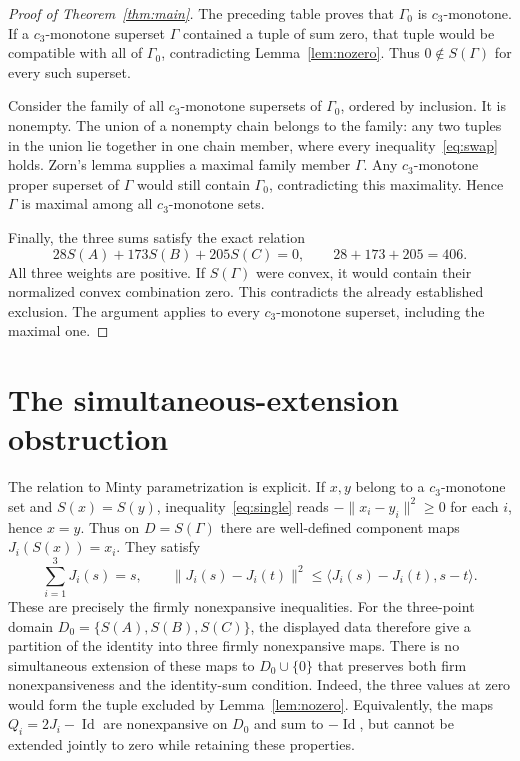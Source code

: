 \documentclass[11pt]{article}
\newcommand{\ip}[2]{\langle #1,#2\rangle}
\newcommand{\norm}[1]{\lVert #1\rVert}
\begin{document}
\begin{proof}[Proof of Theorem~\ref{thm:main}]
The preceding table proves that $\Gamma_0$ is $c_3$-monotone. If a
$c_3$-monotone superset $\Gamma$ contained a tuple of sum zero, that tuple
would be compatible with all of $\Gamma_0$, contradicting
Lemma~\ref{lem:nozero}. Thus $0\notin S(\Gamma)$ for every such superset.

Consider the family of all $c_3$-monotone supersets of $\Gamma_0$, ordered
by inclusion. It is nonempty. The union of a nonempty chain belongs to
the family: any two tuples in the union lie together in one chain member,
where every inequality~\eqref{eq:swap} holds. Zorn's lemma supplies a
maximal family member $\Gamma$. Any $c_3$-monotone proper superset of
$\Gamma$ would still contain $\Gamma_0$, contradicting this maximality.
Hence $\Gamma$ is maximal among all $c_3$-monotone sets.

Finally, the three sums satisfy the exact relation
\[
 28S(A)+173S(B)+205S(C)=0,
 \qquad 28+173+205=406.
\]
All three weights are positive. If $S(\Gamma)$ were convex, it would
contain their normalized convex combination zero. This contradicts the
already established exclusion. The argument applies to every
$c_3$-monotone superset, including the maximal one.
\end{proof}

\section{The simultaneous-extension obstruction}

The relation to Minty parametrization is explicit. If $x,y$ belong to a
$c_3$-monotone set and $S(x)=S(y)$, inequality~\eqref{eq:single} reads
$-\norm{x_i-y_i}^2\ge0$ for each $i$, hence $x=y$. Thus on
$D=S(\Gamma)$ there are well-defined component maps
$J_i(S(x))=x_i$. They satisfy
\[
 \sum_{i=1}^3J_i(s)=s,\qquad
 \norm{J_i(s)-J_i(t)}^2\le
 \ip{J_i(s)-J_i(t)}{s-t}.
\]
These are precisely the firmly nonexpansive inequalities. For the
three-point domain $D_0=\{S(A),S(B),S(C)\}$, the displayed data therefore
give a partition of the identity into three firmly nonexpansive maps.
There is no simultaneous extension of these maps to $D_0\cup\{0\}$ that
preserves both firm nonexpansiveness and the identity-sum condition.
Indeed, the three values at zero would form the tuple excluded by
Lemma~\ref{lem:nozero}. Equivalently, the maps $Q_i=2J_i-\operatorname{Id}$
are nonexpansive on $D_0$ and sum to $-\operatorname{Id}$, but cannot be
extended jointly to zero while retaining these properties.
\end{document}
